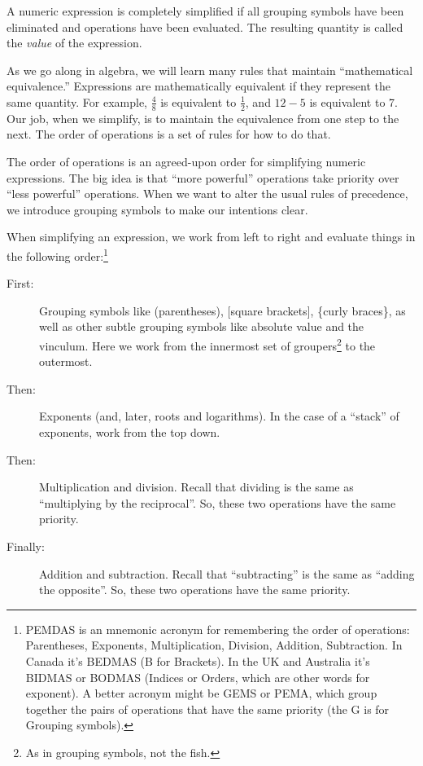 \begin{boxedcriteria}
A numeric expression is completely simplified if all grouping symbols have been eliminated and operations have been evaluated. The resulting quantity is called the {\em value} of the expression.
\end{boxedcriteria}

As we go along in algebra, we will learn many rules that maintain ``mathematical equivalence.''  Expressions are mathematically equivalent if they represent the same quantity.  For example, $\frac{4}{8}$ is equivalent to $\frac{1}{2}$, and $12 - 5$ is equivalent to 7. Our job, when we simplify, is to maintain the equivalence from one step to the next. The order of operations is a set of rules for how to do that.

\begin{boxeddef}
The \gls{order of operations} is an agreed-upon order for simplifying numeric expressions. The big idea is that ``more powerful'' operations take priority over ``less powerful'' operations. When we want to alter the usual rules of precedence, we introduce grouping symbols to make our intentions clear.

When simplifying an expression, we work from left to right and evaluate things in the following order:\footnote{PEMDAS is an mnemonic acronym for remembering the order of operations: Parentheses, Exponents, Multiplication, Division, Addition, Subtraction. In Canada it's BEDMAS (B for Brackets). In the UK and Australia it's BIDMAS or BODMAS (Indices or Orders, which are other words for exponent). A better acronym might be GEMS or PEMA, which group together the pairs of operations that have the same priority (the G is for Grouping symbols).}

\begin{description}
\item[First:] Grouping symbols like (parentheses), [square brackets], \{curly braces\}, as well as other subtle grouping symbols like absolute value and the vinculum. Here we work from the innermost set of groupers\footnote{As in grouping symbols, not the fish.} to the outermost.

\item[Then:] Exponents (and, later, roots and logarithms). In the case of a ``stack'' of exponents, work from the top down.

\item[Then:] Multiplication and division. Recall that dividing is the same as ``multiplying by the reciprocal''. So, these two operations have the same priority.

\item[Finally:] Addition and subtraction. Recall that ``subtracting'' is the same as ``adding the opposite''. So, these two operations have the same priority.
\end{description}
\end{boxeddef}

